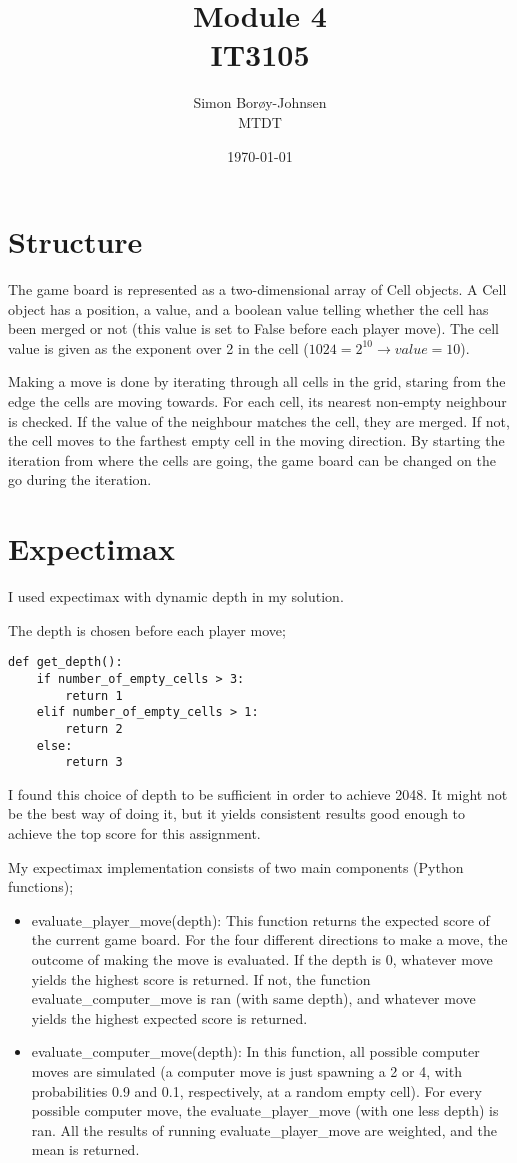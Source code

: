 \documentclass{article}
\begin{document}
\title{\textbf{Module 4} \\ IT3105}
\author{Simon Borøy-Johnsen \\ MTDT}
\date{\today}
\maketitle


\section{Structure}
The game board is represented as a two-dimensional array of Cell objects. A Cell object has a position, a value, and a boolean value telling whether the cell has been merged or not (this value is set to False before each player move). The cell value is given as the exponent over 2 in the cell ($1024 = 2^{10} \rightarrow value=10$).

Making a move is done by iterating through all cells in the grid, staring from the edge the cells are moving towards. For each cell, its nearest non-empty neighbour is checked. If the value of the neighbour matches the cell, they are merged. If not, the cell moves to the farthest empty cell in the moving direction. By starting the iteration from where the cells are going, the game board can be changed on the go during the iteration.

\section{Expectimax}
I used expectimax with dynamic depth in my solution.

The depth is chosen before each player move;
\begin{lstlisting}
def get_depth():
    if number_of_empty_cells > 3:
        return 1
    elif number_of_empty_cells > 1:
        return 2
    else:
        return 3
\end{lstlisting}
I found this choice of depth to be sufficient in order to achieve 2048. It might not be the best way of doing it, but it yields consistent results good enough to achieve the top score for this assignment.

My expectimax implementation consists of two main components (Python functions);
\begin{itemize}
    \item evaluate\_player\_move(depth): This function returns the expected score of the current game board. For the four different directions to make a move, the outcome of making the move is evaluated. If the depth is 0, whatever move yields the highest score is returned. If not, the function evaluate\_computer\_move is ran (with same depth), and whatever move yields the highest expected score is returned.
    \item evaluate\_computer\_move(depth): In this function, all possible computer moves are simulated (a computer move is just spawning a 2 or 4, with probabilities 0.9 and 0.1, respectively, at a random empty cell). For every possible computer move, the evaluate\_player\_move (with one less depth) is ran. All the results of running evaluate\_player\_move are weighted, and the mean is returned.
\end{itemize}
\end{document}

